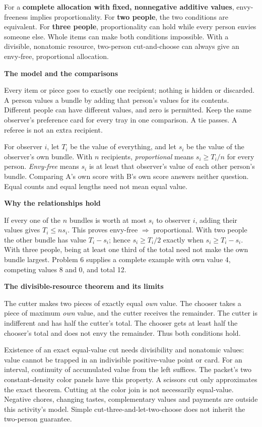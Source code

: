 \documentclass[11pt]{article}
\newcommand{\heading}[1]{\par\vspace{1.5mm}{\large\bfseries #1}\par\vspace{.8mm}}
\newcommand{\subhead}[1]{\par\vspace{1mm}\textbf{#1}\par}
\begin{document}
\heading{Mathematical overview}
For a \textbf{complete allocation with fixed, nonnegative additive values}, envy-freeness implies proportionality. For \textbf{two people}, the two conditions are equivalent. For \textbf{three people}, proportionality can hold while every person envies someone else. Whole items can make both conditions impossible. With a divisible, nonatomic resource, two-person cut-and-choose can always give an envy-free, proportional allocation.

\subhead{The model and the comparisons}
Every item or piece goes to exactly one recipient; nothing is hidden or discarded. A person values a bundle by adding that person's values for its contents. Different people can have different values, and zero is permitted. Keep the same observer's preference card for every tray in one comparison. A tie passes. A referee is not an extra recipient.

For observer $i$, let $T_i$ be the value of everything, and let $s_i$ be the value of the observer's own bundle. With $n$ recipients, \emph{proportional} means $s_i\ge T_i/n$ for every person. \emph{Envy-free} means $s_i$ is at least that observer's value of each other person's bundle. Comparing A's own score with B's own score answers neither question. Equal counts and equal lengths need not mean equal value.

\subhead{Why the relationships hold}
If every one of the $n$ bundles is worth at most $s_i$ to observer $i$, adding their values gives $T_i\le n s_i$. This proves envy-free $\Rightarrow$ proportional. With two people the other bundle has value $T_i-s_i$; hence $s_i\ge T_i/2$ exactly when $s_i\ge T_i-s_i$. With three people, being at least one third of the total need not make the own bundle largest. Problem 6 supplies a complete example with own value 4, competing values 8 and 0, and total 12.

\subhead{The divisible-resource theorem and its limits}
The cutter makes two pieces of exactly equal \emph{own} value. The chooser takes a piece of maximum \emph{own} value, and the cutter receives the remainder. The cutter is indifferent and has half the cutter's total. The chooser gets at least half the chooser's total and does not envy the remainder. Thus both conditions hold.

Existence of an exact equal-value cut needs divisibility and nonatomic values: value cannot be trapped in an indivisible positive-value point or card. For an interval, continuity of accumulated value from the left suffices. The packet's two constant-density color panels have this property. A scissors cut only approximates the exact theorem. Cutting at the color join is not necessarily equal-value. Negative chores, changing tastes, complementary values and payments are outside this activity's model. Simple cut-three-and-let-two-choose does not inherit the two-person guarantee.
\end{document}
